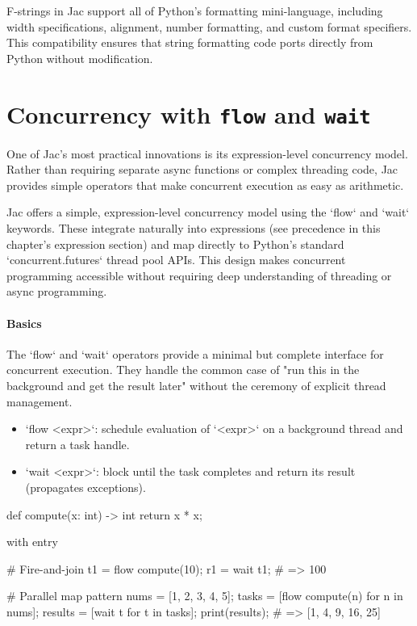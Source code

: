 F-strings in Jac support all of Python's formatting mini-language, including width specifications, alignment, number formatting, and custom format specifiers. This compatibility ensures that string formatting code ports directly from Python without modification.

\section{Concurrency with \texttt{flow} and \texttt{wait}}

One of Jac's most practical innovations is its expression-level concurrency model. Rather than requiring separate async functions or complex threading code, Jac provides simple operators that make concurrent execution as easy as arithmetic.

Jac offers a simple, expression-level concurrency model using the `flow` and `wait` keywords. These integrate naturally into expressions (see precedence in this chapter's expression section) and map directly to Python's standard `concurrent.futures` thread pool APIs. This design makes concurrent programming accessible without requiring deep understanding of threading or async programming.

\paragraph{Basics}

The `flow` and `wait` operators provide a minimal but complete interface for concurrent execution. They handle the common case of "run this in the background and get the result later" without the ceremony of explicit thread management.

\begin{itemize}
    \item `flow <expr>`: schedule evaluation of `<expr>` on a background thread and return a task handle.
    \item `wait <expr>`: block until the task completes and return its result (propagates exceptions).
\end{itemize}

\begin{jacblock}
def compute(x: int) -> int { return x * x; }

with entry {
    # Fire-and-join
    t1 = flow compute(10);
    r1 = wait t1;          # => 100

    # Parallel map pattern
    nums   = [1, 2, 3, 4, 5];
    tasks  = [flow compute(n) for n in nums];
    results = [wait t for t in tasks];
    print(results);        # => [1, 4, 9, 16, 25]
}
\end{jacblock}


